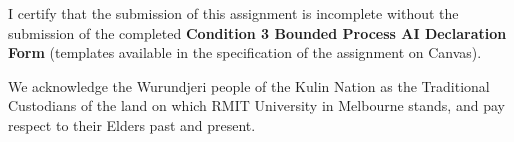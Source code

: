 \documentclass[a4paper, table, 11pt]{article}
\begin{document}
I certify that the submission of this assignment is incomplete without the submission of the completed \textbf{Condition 3 Bounded Process AI Declaration Form} (templates available in the specification of the assignment on Canvas).

\begin{acks}
We acknowledge the Wurundjeri people of the Kulin Nation as the Traditional Custodians of the land on which RMIT University in Melbourne stands, and pay respect to their Elders past and present.
\end{acks}






\appendix %

\end{document}

